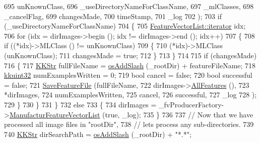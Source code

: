 \begin{DoxyCode}
695                                    unKnownClass,
696                                    \_useDirectoryNameForClassName,
697                                    \_mlClasses,
698                                    \_cancelFlag,
699                                    changesMade,
700                                    timeStamp,
701                                    \_log
702                                   );
703     \textcolor{keywordflow}{if}  (\_useDirectoryNameForClassName)
704     \{
705       \hyperlink{class_k_k_b_1_1_k_k_queue_aa3c2796a726eea468b94132a9fbf2cfe}{FeatureVectorList::iterator}  idx;
706       \textcolor{keywordflow}{for}  (idx = dirImages->begin ();  idx != dirImages->end ();  idx++)
707       \{
708         \textcolor{keywordflow}{if}  ((*idx)->MLClass () != unKnownClass)
709         \{
710           (*idx)->MLClass (unKnownClass);
711           changesMade = \textcolor{keyword}{true};
712         \}
713       \}
714 
715       \textcolor{keywordflow}{if}  (changesMade)
716       \{
717         \hyperlink{class_k_k_b_1_1_k_k_str}{KKStr}  fullFileName = \hyperlink{namespace_k_k_b_aa0d40119b911df4283399a1724cab1ef}{osAddSlash} (\_rootDir) + featureFileName;
718         \hyperlink{namespace_k_k_b_af8d832f05c54994a1cce25bd5743e19a}{kkuint32}  numExamplesWritten = 0;
719         \textcolor{keywordtype}{bool}  cancel     = \textcolor{keyword}{false};
720         \textcolor{keywordtype}{bool}  successful = \textcolor{keyword}{false};
721         \hyperlink{class_k_k_m_l_l_1_1_feature_file_i_o_ab4ad6c5a641f1f8f7c72c1be98bc1da8}{SaveFeatureFile} (fullFileName, 
722                          dirImages->\hyperlink{class_k_k_m_l_l_1_1_feature_vector_list_a3ba96acb7cd625dc94958da2ae750a08}{AllFeatures} (), 
723                          *dirImages, 
724                          numExamplesWritten,
725                          cancel,
726                          successful,
727                          \_log
728                         );
729       \}
730     \}
731   \}
732   \textcolor{keywordflow}{else}
733   \{
734     dirImages =  \_fvProducerFactory->\hyperlink{class_k_k_m_l_l_1_1_factory_f_v_producer_a96126b7adb55f6751450ede393c93086}{ManufacturFeatureVectorList} (\textcolor{keyword}{true}, \_log);
735   \}
736 
737   \textcolor{comment}{// Now that we have processed all image files in "rootDir",}
738   \textcolor{comment}{// lets process any sub-directories.}
739 
740   \hyperlink{class_k_k_b_1_1_k_k_str}{KKStr}  dirSearchPath = \hyperlink{namespace_k_k_b_aa0d40119b911df4283399a1724cab1ef}{osAddSlash} (\_rootDir) + \textcolor{stringliteral}{"*.*"};

\end{DoxyCode}
